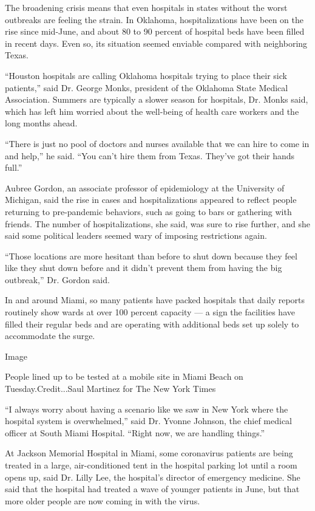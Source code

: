 The broadening crisis means that even hospitals in states without the
worst outbreaks are feeling the strain. In Oklahoma, hospitalizations
have been on the rise since mid-June, and about 80 to 90 percent of
hospital beds have been filled in recent days. Even so, its situation
seemed enviable compared with neighboring Texas.

``Houston hospitals are calling Oklahoma hospitals trying to place their
sick patients,'' said Dr. George Monks, president of the Oklahoma State
Medical Association. Summers are typically a slower season for
hospitals, Dr. Monks said, which has left him worried about the
well-being of health care workers and the long months ahead.

``There is just no pool of doctors and nurses available that we can hire
to come in and help,'' he said. ``You can't hire them from Texas.
They've got their hands full.''

Aubree Gordon, an associate professor of epidemiology at the University
of Michigan, said the rise in cases and hospitalizations appeared to
reflect people returning to pre-pandemic behaviors, such as going to
bars or gathering with friends. The number of hospitalizations, she
said, was sure to rise further, and she said some political leaders
seemed wary of imposing restrictions again.

``Those locations are more hesitant than before to shut down because
they feel like they shut down before and it didn't prevent them from
having the big outbreak,'' Dr. Gordon said.

In and around Miami, so many patients have packed hospitals that daily
reports routinely show wards at over 100 percent capacity --- a sign the
facilities have filled their regular beds and are operating with
additional beds set up solely to accommodate the surge.

Image

People lined up to be tested at a mobile site in Miami Beach on
Tuesday.Credit...Saul Martinez for The New York Times

``I always worry about having a scenario like we saw in New York where
the hospital system is overwhelmed,'' said Dr. Yvonne Johnson, the chief
medical officer at South Miami Hospital. ``Right now, we are handling
things.''

At Jackson Memorial Hospital in Miami, some coronavirus patients are
being treated in a large, air-conditioned tent in the hospital parking
lot until a room opens up, said Dr. Lilly Lee, the hospital's director
of emergency medicine. She said that the hospital had treated a wave of
younger patients in June, but that more older people are now coming in
with the virus.

